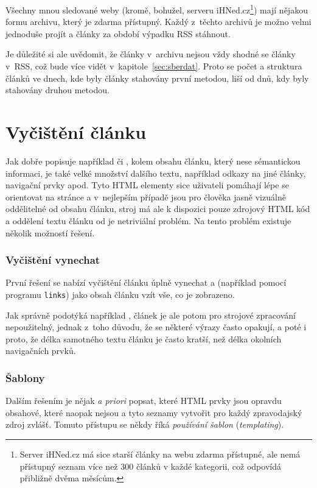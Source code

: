 \documentclass[12pt,a4paper]{report}
\begin{document}
Všechny mnou sledované weby (kromě, bohužel, serveru iHNed.cz\footnote{Server iHNed.cz má sice starší články na webu zdarma přístupné, ale nemá přístupný seznam více než 300 článků v každé kategorii, což odpovídá přibližně dvěma měsícům.}) mají nějakou formu archivu, který je zdarma přístupný. Každý z~těchto archivů je možno velmi jednoduše projít a články za období výpadku RSS stáhnout.

Je důležité si ale uvědomit, že články v~archivu nejsou vždy shodné se články v~RSS, což bude více vidět v~kapitole~\ref{sec:sberdat}. Proto se počet a struktura článků ve dnech, kde byly články stahovány první metodou, liší od dnů, kdy byly stahovány druhou metodou.



\section{Vyčištění článku}
Jak dobře popisuje například \cite{eliminating} či \cite{discovering}, kolem  obsahu článku, který nese sémantickou informaci, je také velké množství dalšího textu, například odkazy na jiné články, navigační prvky apod. Tyto HTML elementy sice uživateli pomáhají lépe se orientovat na stránce a v~nej\-lep\-ším případě jsou pro člověka jasně vizuálně oddělitelné od obsahu článku, stroj má ale k dispozici pouze zdrojový HTML kód a od\-dělení  textu článku od  je netriviální problém. Na tento problém existuje několik možností řešení.

\subsubsection{Vyčištění vynechat}
První řešení se nabízí vyčištění článku úplně vynechat a (například pomocí programu \texttt{links}) jako obsah článku vzít vše, co je zobrazeno.

Jak správně podotýká například \cite{discovering}, článek je ale potom pro strojové zpracování nepoužitelný, jednak z~toho důvodu, že se některé výrazy často opakují, a poté i proto, že délka samotného textu článku je často kratší, než délka okolních navigačních prvků.

\subsubsection{Šablony}
Dalším řešením je nějak \emph{a priori} popsat, které HTML prvky jsou opravdu obsahové, které naopak nejsou a tyto seznamy vytvořit pro každý zpravodajský zdroj zvlášť. Tomuto přístupu se někdy říká \emph{používání šablon} (\emph{templating}).
\end{document}
